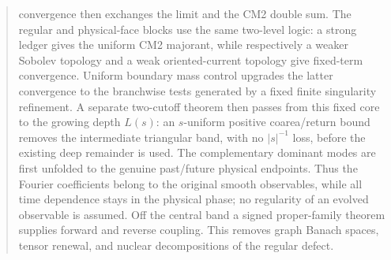 \documentclass[11pt]{article}
\begin{document}
\begin{abstract}
convergence then exchanges the limit and the CM2 double sum.  The regular and
physical-face blocks use the same two-level logic: a strong ledger gives the
uniform CM2 majorant, while respectively a weaker Sobolev topology and a
weak oriented-current topology give fixed-term convergence.  Uniform boundary
mass control upgrades the latter convergence to the branchwise tests generated
by a fixed finite singularity refinement.  A separate two-cutoff theorem then
passes from this fixed core to the growing depth $L(s)$: an $s$-uniform
positive coarea/return bound removes the intermediate triangular band, with no
$|s|^{-1}$ loss, before the existing deep remainder is used.
The complementary dominant
modes are first unfolded to the genuine past/future physical endpoints.  Thus
the Fourier coefficients belong to the original smooth observables, while all
time dependence stays in the physical phase; no regularity of an evolved
observable is assumed.  Off the
central band a signed proper-family theorem supplies forward and reverse
coupling.  This removes graph Banach spaces, tensor renewal, and nuclear
decompositions of the regular defect.


\end{abstract}
\end{document}
